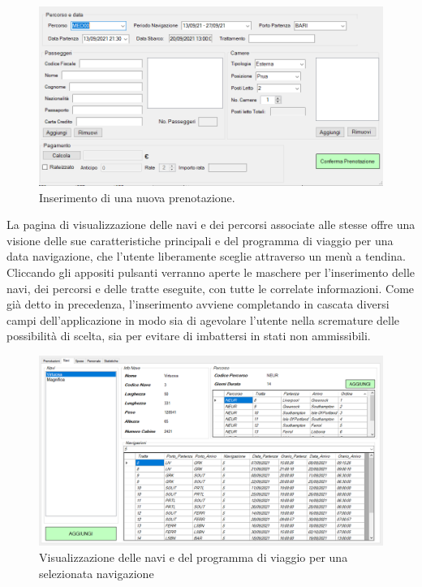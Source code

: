 \documentclass[a4paper, titlepage]{report}
\begin{document}
\begin{figure}[h]
\centering{}
\includegraphics[scale=0.6]{images/screen-insert-booking.PNG}
\caption{Inserimento di una nuova prenotazione.}
\label{img:insert-booking}
\end{figure}

\newpage \noindent
La pagina di visualizzazione delle navi e dei percorsi associate alle stesse offre una visione delle sue caratteristiche principali e del programma di viaggio per una data navigazione, che l'utente liberamente sceglie attraverso un menù a tendina. Cliccando gli appositi pulsanti verranno aperte le maschere per l'inserimento delle navi, dei percorsi e delle tratte eseguite, con tutte le correlate informazioni. Come già detto in precedenza, l'inserimento avviene completando in cascata diversi campi dell'applicazione in modo sia di agevolare l'utente nella scremature delle possibilità di scelta, sia per evitare di imbattersi in stati non ammissibili.

\begin{figure}[h]
\centering{}
\includegraphics[width=\textwidth]{images/screen-ships.PNG}
\caption{Visualizzazione delle navi e del programma di viaggio per una selezionata navigazione}
\label{img:screen-ships}
\end{figure}
\end{document}
